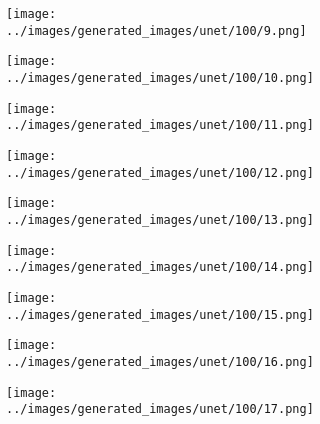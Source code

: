 \begin{figure}[H]
 \hspace{1em}%
 \begin{subfigure}[b]{0.1\textwidth}
   \centering
   \texttt{[image: ../images/generated\_images/unet/100/9.png]}
 \end{subfigure}
 \hspace{1em}%
 \begin{subfigure}[b]{0.1\textwidth}
   \centering
   \texttt{[image: ../images/generated\_images/unet/100/10.png]}
 \end{subfigure}
 \hspace{1em}%
 \begin{subfigure}[b]{0.1\textwidth}
   \centering
   \texttt{[image: ../images/generated\_images/unet/100/11.png]}
 \end{subfigure}
 \hspace{1em}%
 \begin{subfigure}[b]{0.1\textwidth}
 \centering
 \texttt{[image: ../images/generated\_images/unet/100/12.png]}
 \end{subfigure}
 \hspace{1em}%
 \begin{subfigure}[b]{0.1\textwidth}
   \centering
   \texttt{[image: ../images/generated\_images/unet/100/13.png]}
 \end{subfigure}
 \hspace{1em}%
 \begin{subfigure}[b]{0.1\textwidth}
   \centering
   \texttt{[image: ../images/generated\_images/unet/100/14.png]}
 \end{subfigure}
 \hspace{1em}%
 \begin{subfigure}[b]{0.1\textwidth}
   \centering
   \texttt{[image: ../images/generated\_images/unet/100/15.png]}
 \end{subfigure}
 \hspace{1em}%
 \begin{subfigure}[b]{0.1\textwidth}
 \centering
 \texttt{[image: ../images/generated\_images/unet/100/16.png]}
 \end{subfigure}
 \hspace{1em}%
 \begin{subfigure}[b]{0.1\textwidth}
 \centering
 \texttt{[image: ../images/generated\_images/unet/100/17.png]}
\end{subfigure}
\hspace{1em}%

\end{figure}
